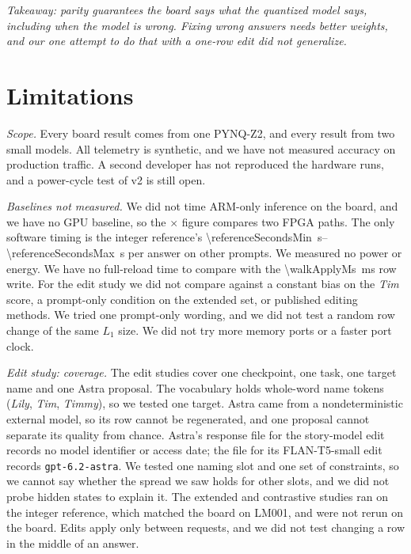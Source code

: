 \documentclass[conference,10pt,letterpaper]{IEEEtran}
\newcommand{\secrange}[2]{\SIrange{#1}{#2}{\second}}
\newcommand{\ms}[1]{\SI{#1}{\milli\second}}
\newcommand{\pynq}{\mbox{PYNQ-Z2}}
\newcommand{\flan}{\mbox{FLAN-T5-small}}
\begin{document}
\textit{Takeaway: parity guarantees the board says what the quantized model says, including when the model is wrong. Fixing wrong answers needs better weights, and our one attempt to do that with a one-row edit did not generalize.}

\section{Limitations}
\label{sec:limits}

\emph{Scope.} Every board result comes from one \pynq, and every result from two small models. All telemetry is synthetic, and we have not measured accuracy on production traffic. A second developer has not reproduced the hardware runs, and a power-cycle test of v2 is still open.

\emph{Baselines not measured.} We did not time ARM-only inference on the board, and we have no GPU baseline, so the \latLadderSpeedup$\times$ figure compares two FPGA paths. The only software timing is the integer reference's \secrange{\referenceSecondsMin}{\referenceSecondsMax} per answer on other prompts. We measured no power or energy. We have no full-reload time to compare with the \ms{\walkApplyMs} row write. For the edit study we did not compare against a constant bias on the \emph{Tim} score, a prompt-only condition on the extended set, or published editing methods. We tried one prompt-only wording, and we did not test a random row change of the same $L_1$ size. We did not try more memory ports or a faster port clock.

\emph{Edit study: coverage.} The edit studies cover one checkpoint, one task, one target name and one Astra proposal. The vocabulary holds \singleTokenNames{} whole-word name tokens (\emph{Lily}, \emph{Tim}, \emph{Timmy}), so we tested one target. Astra came from a nondeterministic external model, so its row cannot be regenerated, and one proposal cannot separate its quality from chance. Astra's response file for the story-model edit records no model identifier or access date; the file for its \flan{} edit records \texttt{gpt-6.2-astra}. We tested one naming slot and one set of constraints, so we cannot say whether the spread we saw holds for other slots, and we did not probe hidden states to explain it. The extended and contrastive studies ran on the integer reference, which matched the board on LM001, and were not rerun on the board. Edits apply only between requests, and we did not test changing a row in the middle of an answer.
\end{document}
